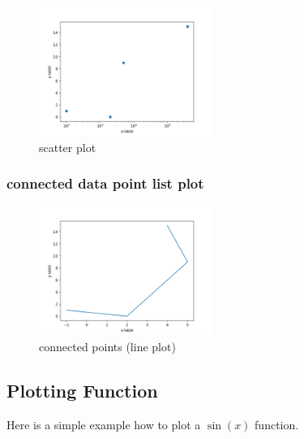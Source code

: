 \documentclass[10pt,a4paper]{article}
\begin{document}
\begin{figure}[htbp]\centering \caption{scatter plot}
\includegraphics[width=0.5\textwidth]{plot_list_data_3.png}
\end{figure}

\subsubsection{connected data point list plot}

\begin{figure}[htbp]\centering \caption{connected points (line plot)}
\includegraphics[width=0.5\textwidth]{plot_list_data_4.png}
\end{figure}

\subsection{Plotting Function}
Here is a simple example how to plot a $\sin(x)$ function.

\end{document}
